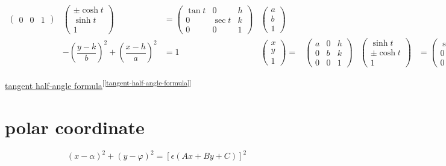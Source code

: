 \documentclass[
]{book}
\theoremstyle{definition}
\theoremstyle{definition}
\theoremstyle{definition}
\theoremstyle{definition}
\theoremstyle{remark}
\begin{document}
\[\begin{array}{cccccccc}
\begin{pmatrix}
0 & 0 & 1
\end{pmatrix} & \begin{pmatrix}\pm\cosh t\\
\sinh t\\
1
\end{pmatrix} & =\begin{pmatrix}\tan t & 0 & h\\
0 & \sec t & k\\
0 & 0 & 1
\end{pmatrix} & \begin{pmatrix}a\\
b\\
1
\end{pmatrix}\\
 & -\left(\dfrac{y-k}{b}\right)^{2}+\left(\dfrac{x-h}{a}\right)^{2} & =1 & \begin{pmatrix}x\\
y\\
1
\end{pmatrix}= & \begin{pmatrix}a & 0 & h\\
0 & b & k\\
0 & 0 & 1
\end{pmatrix} & \begin{pmatrix}\sinh t\\
\pm\cosh t\\
1
\end{pmatrix} & =\begin{pmatrix}\sec t & 0 & h\\
0 & \tan t & k\\
0 & 0 & 1
\end{pmatrix} & \begin{pmatrix}a\\
b\\
1
\end{pmatrix}
\end{array}
\]

\protect\hyperlink{tangent-half-angle-formula}{tangent half-angle formula}\textsuperscript{{[}\ref{tangent-half-angle-formula}{]}}

\hypertarget{polar-coordinate}{%
\section{polar coordinate}\label{polar-coordinate}}

\[
\left(x-\alpha\right)^{2}+\left(y-\varphi\right)^{2}=\left[\epsilon\left(Ax+By+C\right)\right]^{2}
\]
\end{document}
